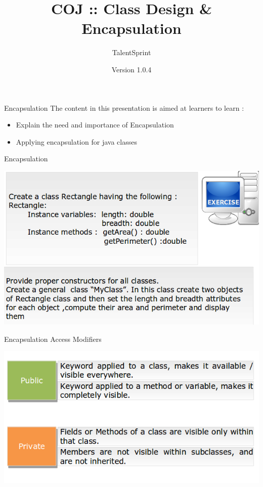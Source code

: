 \documentclass[14pt]{beamer}
\title[CP01.13 BC]{COJ :: Class Design \& Encapsulation}
\author[TS]{TalentSprint}
\institute[L\&D]{Licensed To Skill}
\date{Version 1.0.4}
\begin{document}
\begin{frame}
  \titlepage
\end{frame}
\begin{frame}{Encapsulation}
The content in this presentation is aimed at learners to learn : 
 \begin{itemize}
  \item Explain the need and importance of Encapsulation
  \item Applying encapsulation for java classes
 \end{itemize}
\end{frame}

\begin{frame}{Encapsulation}
\begin{center}
    \includegraphics[scale=0.4]{COJ-M01-S05-Image1.png}
  \end{center}
\end{frame}
\begin{frame}{Encapsulation}
Access Modifiers
\begin{center}
        \includegraphics[scale=0.5]{COJ-M01-S05-Image2.png}
          \end{center}
      \end{frame}
\end{document}
